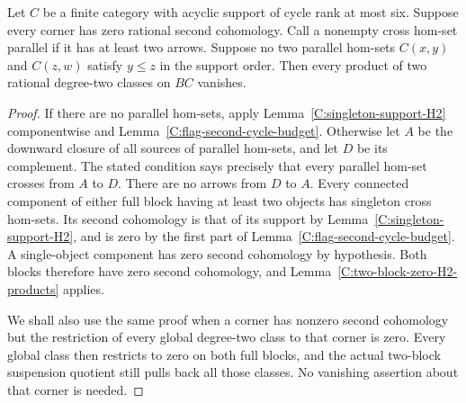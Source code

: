 \begin{lemma}
\label{C:parallel-hom-cut}
Let $C$ be a finite category with acyclic support of cycle rank
at most six.  Suppose every corner has zero rational second
cohomology.  Call a nonempty cross hom-set parallel if it has
at least two arrows.  Suppose no two parallel hom-sets
$C(x,y)$ and $C(z,w)$ satisfy $y\leq z$ in the support order.
Then every product of two rational degree-two classes on $BC$
vanishes.
\end{lemma}
\begin{proof}
If there are no parallel hom-sets, apply
Lemma~\ref{C:singleton-support-H2} componentwise and
Lemma~\ref{C:flag-second-cycle-budget}.
Otherwise let $A$ be the downward closure of all sources of
parallel hom-sets, and let $D$ be its complement.  The stated
condition says precisely that every parallel hom-set crosses
from $A$ to $D$.  There are no arrows from $D$ to $A$.
Every connected component of either full block having at least
two objects has singleton cross hom-sets.  Its second
cohomology is that of its support by
Lemma~\ref{C:singleton-support-H2}, and is zero by the first
part of Lemma~\ref{C:flag-second-cycle-budget}.  A single-object
component has zero second cohomology by hypothesis.  Both
blocks therefore have zero second cohomology, and
Lemma~\ref{C:two-block-zero-H2-products} applies.

We shall also use the same proof when a corner has nonzero
second cohomology but the restriction of every global
degree-two class to that corner is zero.  Every global class
then restricts to zero on both full blocks, and the actual
two-block suspension quotient still pulls back all those
classes.  No vanishing assertion about that corner is needed.
\end{proof}

